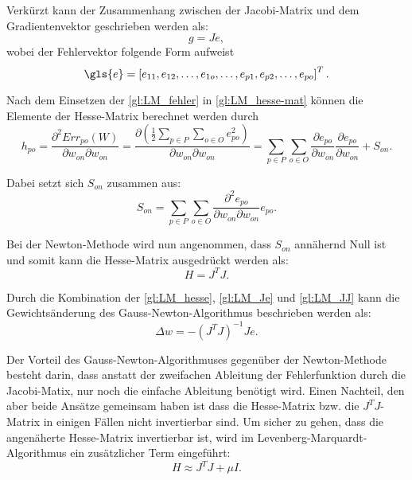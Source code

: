 Verkürzt kann der Zusammenhang zwischen der Jacobi-Matrix und dem Gradientenvektor geschrieben werden als:
\begin{equation}
g = Je,
\label{gl:LM_Je}
\end{equation}
wobei der Fehlervektor folgende Form aufweist
\begin{equation}
\gls{e}= \left [ e_{11}, e_{12}, \dots, e_{1o}, \dots, e_{p1}, e_{p2}, \dots, e_{po} \right ]^T.
\label{gl:LM_bp}
\end{equation}

Nach dem Einsetzen der \autoref{gl:LM_fehler} in \autoref{gl:LM_hesse-mat} können die Elemente der Hesse-Matrix berechnet werden durch
\begin{equation}
h_{po} = \frac{\partial^2 Err_{po}(W)}{\partial w_{on} \partial w_{on}} = \frac{\partial \left (\frac{1}{2} \sum_{p \in P} \sum_{o \in O} e_{po}^2 \right )}{\partial w_{on} \partial w_{on}} 
=
\sum_{p \in P} \sum_{o \in O} \frac{\partial e_{po}}{\partial w_{on}} \frac{\partial e_{po}}{\partial w_{on}} + S_{on}.
\label{gl:LM-h}
\end{equation}

Dabei setzt sich $S_{on}$ zusammen aus:
\begin{equation}
S_{on} = \sum_{p \in P} \sum_{o \in O} \frac{\partial^2 e_{po}}{\partial w_{on} \partial w_{on}} e_{po}.
\label{gl:LM_S}
\end{equation}

Bei der Newton-Methode wird nun angenommen, dass $S_{on}$ annähernd Null ist\, und somit kann die Hesse-Matrix ausgedrückt werden als:
\begin{equation}
H = J^T J.
\label{gl:LM_JJ}
\end{equation}

Durch die Kombination der \autoref{gl:LM_hesse}, \autoref{gl:LM_Je} und \autoref{gl:LM_JJ} kann die Gewichtsänderung des Gauss-Newton-Algorithmus beschrieben werden als:
\begin{equation}
\Delta w =-(J^T J)^{-1} J e.
\label{gl:LM_GNA}
\end{equation}

Der Vorteil des Gauss-Newton-Algorithmuses gegenüber der Newton-Methode besteht darin, dass anstatt der zweifachen Ableitung der Fehlerfunktion durch die Jacobi-Matix, nur noch die einfache Ableitung benötigt wird. Einen Nachteil, den aber beide Ansätze gemeinsam haben ist dass die Hesse-Matrix bzw. die $J^T J$-Matrix in einigen Fällen nicht invertierbar sind. Um sicher zu gehen, dass die angenäherte Hesse-Matrix invertierbar ist, wird im Levenberg-Marquardt-Algorithmus ein zusätzlicher Term eingeführt:
\begin{equation}
H \approx J^T J + \mu I.
\label{gl:LM_lm-H}
\end{equation}

